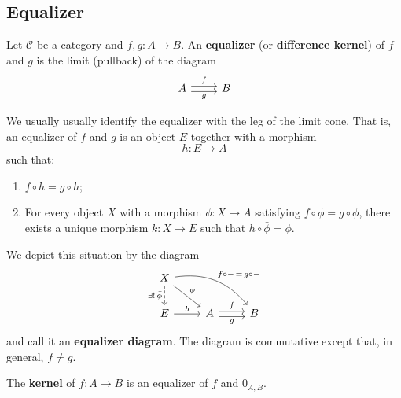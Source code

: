 \documentclass[12pt, oneside]{book}
\begin{document}
\subsection{Equalizer}
\begin{definition}
    Let $\mathcal{C}$ be a category and $f,g: A \to B$.
    An \textbf{equalizer} (or \textbf{difference kernel}) of $f$ and $g$ is the limit (pullback) of the diagram
    \begin{equation*}
        \begin{tikzcd}
            A \arrow[r, shift left, "f"] \arrow[r, shift right, swap, "g"] & B
        \end{tikzcd}
    \end{equation*}
    \begin{remark}
        We usually usually identify the equalizer with the leg of the limit cone. That is, an equalizer of $f$ and $g$ is an object $E$ together with a morphism
        \begin{equation*}
            h : E \to A
        \end{equation*}
        such that:
        \begin{enumerate}[label=(\roman*)]
            \item
                  $f \circ h = g \circ h$;
            \item
                  For every object $X$ with a morphism $\phi : X \to A$ satisfying $f \circ \phi = g \circ \phi$,
                  there exists a unique morphism $k : X \to E$ such that $h \circ \bar{\phi} = \phi$.
        \end{enumerate}
        We depict this situation by the diagram
        \begin{equation*}
            \begin{tikzcd}
                X \arrow[dashed, d, "\exists!\,\bar{\phi}"'] \arrow[rd, "\phi"] \arrow[rrd, bend left, "f\circ -\, = \, g\circ-"] & & \\
                E \arrow[r, "h"] & A \arrow[r, shift left, "f"] \arrow[r, shift right, swap, "g"] & B
            \end{tikzcd}
        \end{equation*}
        and call it an \textbf{equalizer diagram}.
        The diagram is commutative except that, in general, $f \neq g$.
    \end{remark}
\end{definition}

\begin{definition}
    The \textbf{kernel} of $f:A \to B$ is an equalizer of $f$ and $0_{A,B}$.
\end{definition}
\end{document}
